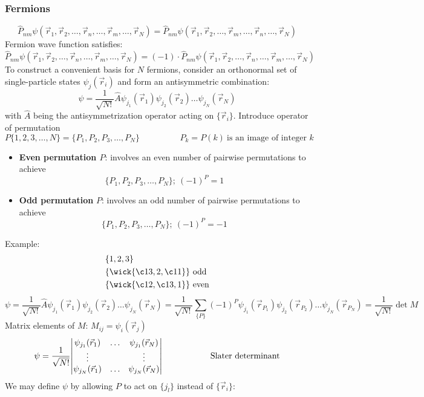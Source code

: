 \documentclass[10pt]{article}
\newcommand{\smallspace}{\hspace{2cm}}
\begin{document}
\subsubsection{Fermions}
$$
\hat P_{nm} \psi(\vec r_1, \vec r_2, \hdots, \vec r_n, \hdots, \vec r_m, \hdots, \vec r_N) = \hat P_{nm} \psi(\vec r_1, \vec r_2, \hdots, \vec r_m, \hdots, \vec r_n, \hdots, \vec r_N)
$$
Fermion wave function satisfies:
$$
\hat P_{nm} \psi(\vec r_1, \vec r_2, \hdots, \vec r_n, \hdots, \vec r_m, \hdots, \vec r_N) = 
(-1) \cdot \hat P_{nm} \psi(\vec r_1, \vec r_2, \hdots, \vec r_n, \hdots, \vec r_m, \hdots, \vec r_N)
$$
To construct a convenient basis for $N$ fermions, consider an orthonormal set of single-particle states $\psi_j(\vec r_i)$ and form an antisymmetric combination:
$$
\psi = \frac{1}{\sqrt{N!}}\hat A \psi_{j_1}(\vec r_1)\psi_{j_2}(\vec r_2)\hdots\psi_{j_N}(\vec r_N)
$$
with $\hat A$ being the antisymmetrization operator acting on $\{\vec r_i\}$. Introduce operator of permutation
$$
P\{1,2,3,\hdots,N\} = \{P_1, P_2, P_3, \hdots, P_N\} \smallspace P_k = P(k) \ \text{is an image of integer $k$}
$$
\begin{itemize}
    \item \textbf{Even permutation $P$}: involves an even number of pairwise permutations to achieve 
        $$
        \{P_1, P_2, P_3, \hdots, P_N\}; \ (-1)^P = 1
        $$
    \item \textbf{Odd permutation}  $P$: involves an odd number of pairwise permutations to achieve 
        $$
        \{P_1, P_2, P_3, \hdots, P_N\}; \ (-1)^P = -1
        $$
\end{itemize}
Example:
\begin{align*}
    &\{1,2,3\}\\
    &\{\wick{\c1 3,2,\c1 1}\} \ \text{odd} \\
    &\{\wick{\c1 2,\c1 3,1}\} \ \text{even}
\end{align*}
$$
\psi = \frac{1}{\sqrt{N!}}\hat A \psi_{j_1}(\vec r_1)\psi_{j_2}(\vec r_2)\hdots\psi_{j_N}(\vec r_N) = \frac{1}{\sqrt{N!}}\sum_{\{P\}}(-1)^{P}\psi_{j_1}(\vec r_{P_1})\psi_{j_2}(\vec r_{P_2})\hdots\psi_{j_N}(\vec r_{P_N}) = \frac{1}{\sqrt{N!}}\det M
$$
Matrix elements of $M$: $M_{ij} = \psi_i(\vec r_j)$
$$
\psi = \frac{1}{\sqrt{N!}}\mqty|\psi_{j_1}(\vec r_1) & \hdots & \psi_{j_1}(\vec r_N) \\ \vdots & & \vdots \\ \psi_{j_N}(\vec r_1) & \hdots & \psi_{j_N}(\vec r_N)| \smallspace \text{Slater determinant}
$$
We may define $\psi$ by allowing $P$ to act on $\{j_l\}$ instead of $\{\vec r_i\}$:
\end{document}
